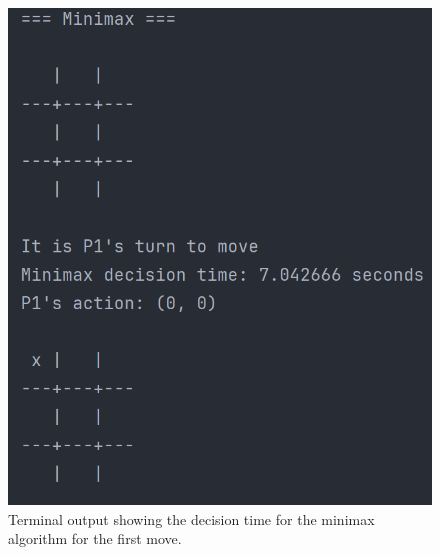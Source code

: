 \documentclass[11pt]{article}
\begin{document}
\begin{figure}[H]
    \centering
    \begin{minipage}[b]{0.48\textwidth}
        \centering
        \includegraphics[width=\textwidth]{Images/tic_tac_toe_decision_time_minimax}
        \caption{Terminal output showing the decision time for the minimax algorithm for the first move.}
        \label{fig:tic_tac_toe_decision_time_minimax}
    \end{minipage}
    \hfill
    \begin{minipage}[b]{0.48\textwidth}
        \centering

\end{minipage}
\end{figure}
\end{document}
